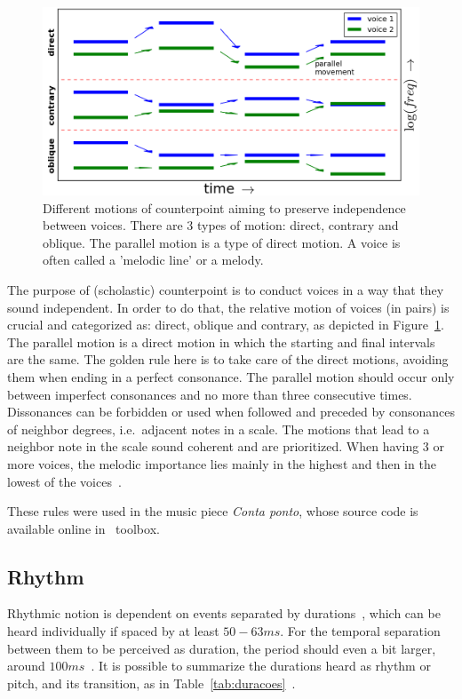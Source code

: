\begin{figure}[h!]
    \centering
        \includegraphics[width=.8\columnwidth]{figures/movContraponto_}
    \caption{Different motions of counterpoint aiming to preserve independence
        between voices. There are 3 types of motion: direct, contrary and
        oblique. The parallel motion is a type of direct motion.
	A voice is often called a 'melodic line' or a melody.}
        \label{fig:movContraponto}
\end{figure}

The purpose of (scholastic) counterpoint is to conduct voices in a way that they sound independent. In order to do that, the relative motion of voices (in pairs) is crucial and
categorized as: direct, oblique and contrary, as depicted in Figure~\ref{fig:movContraponto}.
The parallel motion is a direct motion in which the starting and final intervals are the same.
The golden rule here is to take care of the direct motions, avoiding them
when ending in a perfect consonance. The parallel motion should occur only between
imperfect consonances and no more than three consecutive times. Dissonances can be forbidden or used when followed and preceded by consonances of neighbor
degrees, i.e.\ adjacent notes in a scale. The motions that lead to a
neighbor note in the scale sound coherent and are prioritized. When having 3 or more voices, the melodic
importance lies mainly in the highest and then in the lowest of the voices~\cite{Fux,Tragtenberg,SchoenbergContra}.

These rules were used in the music piece \emph{Conta ponto}, whose source code is
available online in \massa\ toolbox.

\subsection{Rhythm}\label{subsec:ritmo}
Rhythmic notion is dependent on events separated by durations~\cite{Lacerda}, which can be heard individually if spaced by at least $50-63ms$. For the temporal separation between them to be perceived as duration, the period should even a bit larger, around $100ms$~\cite{microsound}.
It is possible to summarize the durations heard as rhythm or pitch, and its transition,
as in Table~\ref{tab:duracoes}~\cite{Alfaix, microsound}.

